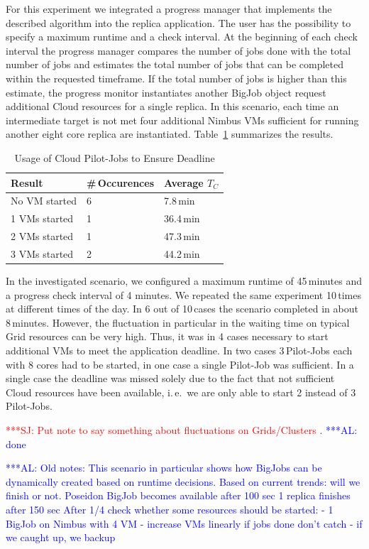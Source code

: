 \documentclass[conference,final]{IEEEtran}
\newcommand{\tc}{$T_{C}$ }
\newcommand{\alnote}[1]{ {\textcolor{blue} { ***AL: #1 }}}
\newcommand{\jhanote}[1]{ {\textcolor{red} { ***SJ: #1 }}}
\newcommand{\alnote}[1]{}
\newcommand{\jhanote}[1]{}
\begin{document}
For this experiment we integrated a progress manager that implements
the described algorithm into the replica application.  The user has
the possibility to specify a maximum runtime and a check interval.  At
the beginning of each check interval the progress manager compares the
number of jobs done with the total number of jobs and estimates the
total number of jobs that can be completed within the requested
timeframe. If the total number of jobs is higher than this estimate,
the progress monitor instantiates another BigJob object request
additional Cloud resources for a single replica.  In this scenario,
each time an intermediate target is not met four additional Nimbus VMs
sufficient for running another eight core replica are instantiated.
Table~\ref{tab:app_deadline} summarizes the results.

\begin{table}[ht]
    \centering
	\begin{tabular}{|l|l|l|}
	\hline
    Result & \#\,Occurences &Average \tc \\ \hline
	No VM started &6 &7.8\,min\\ \hline
	1 VMs started &1 &36.4\,min\\ \hline
	2 VMs started &1 &47.3\,min\\ \hline
	3 VMs started &2 &44.2\,min\\ \hline
	\end{tabular}
	\caption{Usage of Cloud Pilot-Jobs to Ensure Deadline \label{tab:app_deadline}}
\end{table}

In the investigated scenario, we configured a maximum runtime of
45\,minutes and a progress check interval of 4 minutes. We repeated
the same experiment 10\,times at different times of the day. In 6 out
of 10\,cases the scenario completed in about 8\,minutes. However, the
fluctuation in particular in the waiting time on typical Grid
resources can be very high. Thus, it was in 4 cases necessary to
start additional VMs to meet the application deadline. 
In two cases 3\,Pilot-Jobs each with 8 cores had to be
started, in one case a single Pilot-Job was sufficient. 
In a single case the deadline was missed
solely due to the fact that not sufficient Cloud resources have been
available, i.\,e.\ we are only able to start 2 instead of 3 Pilot-Jobs. 

\jhanote{Put note to say something about fluctuations on
  Grids/Clusters}. \alnote{done}

\alnote{Old notes: This scenario in particular shows how BigJobs can
  be dynamically created based on runtime decisions.  Based on current
  trends: will we finish or not.  Poseidon BigJob becomes available
  after 100 sec 1 replica finishes after 150 sec After 1/4 check
  whether some resources should be started: - 1 BigJob on Nimbus with
  4 VM - increase VMs linearly if jobs done don't catch - if we caught
  up, we backup}
\end{document}
